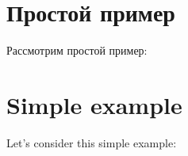 \ifdefined\RUSSIAN
\section{Простой пример}

Рассмотрим простой пример:
\fi

\ifdefined\ENGLISH
\section{Simple example}

Let's consider this simple example:
\fi





\EN{}
\RU{}

